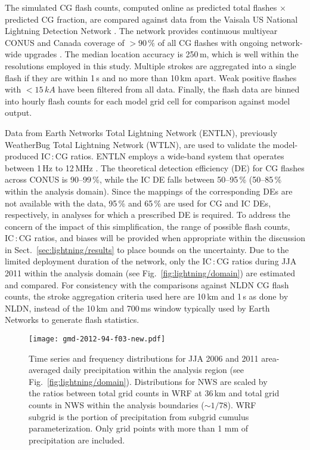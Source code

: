 The simulated CG flash counts, computed online as predicted total flashes
$\times$ predicted CG fraction, are compared against data from the Vaisala
US National Lightning Detection Network \citep[NLDN;][]{5173582}. The
network provides continuous multiyear CONUS and Canada coverage of
$>90\,{\%}$ of all CG flashes with ongoing network-wide upgrades
\citep{Orville:2002uq,Orville:2010uq}. The median location accuracy is
250\,\unit{m}, which is well within the resolutions employed in this study.
Multiple strokes are aggregated into a single flash if they are within 1\,\unit{s}
and no more than 10\,\unit{km} apart. Weak positive flashes with
$<15\,\unit{kA}$ have been filtered from all data. Finally, the flash data
are binned into hourly flash counts for each model grid cell for comparison
against model output.

Data from Earth Networks Total Lightning Network (ENTLN), previously
WeatherBug Total Lightning Network (WTLN), are used to validate the
model-produced IC\,:\,CG ratios. ENTLN employs a wide-band system that
operates between 1\,\unit{Hz} to 12\,\unit{MHz} \citep{Liu:2011vn}. The
theoretical detection efficiency (DE) for CG flashes across CONUS is
90--99\,{\%}, while the IC DE falls between 50--95\,{\%} (50--85\,{\%} within
the analysis domain). Since the mappings of the corresponding DEs are not
available with the data, 95\,{\%} and 65\,{\%} are used for CG and IC DEs,
respectively, in analyses for which a prescribed DE is required. To address
the concern of the impact of this simplification, the range of possible flash
counts, IC\,:\,CG ratios, and biases will be provided when appropriate within
the discussion in Sect.~\ref{sec:lightning/results} to place bounds on the
uncertainty. Due to the limited deployment duration of the network, only the
IC\,:\,CG ratios during JJA 2011 within the analysis domain (see
Fig.~\ref{fig:lightning/domain}) are estimated and compared. For consistency with the
comparisons against NLDN CG flash counts, the stroke aggregation criteria
used here are 10\,\unit{km} and 1\,s as done by NLDN, instead of the
10\,\unit{km} and 700\,\unit{ms} window typically used by Earth Networks to
generate flash statistics.

\begin{figure*}[t]
      \texttt{[image: gmd-2012-94-f03-new.pdf]}
      \caption{Time series and frequency distributions for JJA 2006
          and 2011 area-averaged daily precipitation within the
          analysis region (see Fig.~\ref{fig:lightning/domain}). Distributions
          for NWS are scaled by the ratios between total grid counts in
          WRF at 36\,\unit{km} and total grid counts in NWS within the
          analysis boundaries ($\sim1/78$). WRF subgrid is the portion
          of precipitation from subgrid cumulus parameterization. Only
          grid points with more than 1 mm of precipitation are
          included.}
      \label{fig:lightning/precipseries}
\end{figure*}



